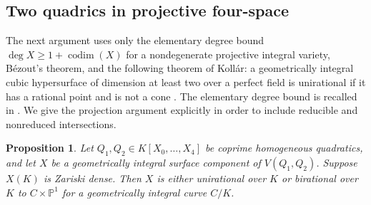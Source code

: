 \documentclass[11pt]{article}
\newtheorem{proposition}[theorem]{Proposition}
\theoremstyle{definition}
\begin{document}
\subsection{Two quadrics in projective four-space}

The next argument uses only the elementary degree bound
$\deg X\geq1+\operatorname{codim}(X)$ for a nondegenerate projective
integral variety, B\'ezout's theorem, and the following theorem of
Koll\'ar: a geometrically integral cubic hypersurface of dimension at
least two over a perfect field is unirational if it has a rational
point and is not a cone \cite[Theorem~2]{lbKollar2002}.
The elementary degree bound is recalled in
\cite[Introduction]{p2lbEGHP2006}.  We give the projection argument
explicitly in order to include reducible and nonreduced intersections.

\begin{proposition}\label{p2lb:two-quadrics-surface}
Let $Q_1,Q_2\in K[X_0,\ldots,X_4]$ be coprime homogeneous
quadratics, and let $X$ be a geometrically integral surface component
of $V(Q_1,Q_2)$.  Suppose $X(K)$ is Zariski dense.
Then $X$ is either unirational over $K$ or birational over $K$ to
$C\times\mathbb P^1$ for a geometrically integral curve $C/K$.
\end{proposition}
\end{document}
